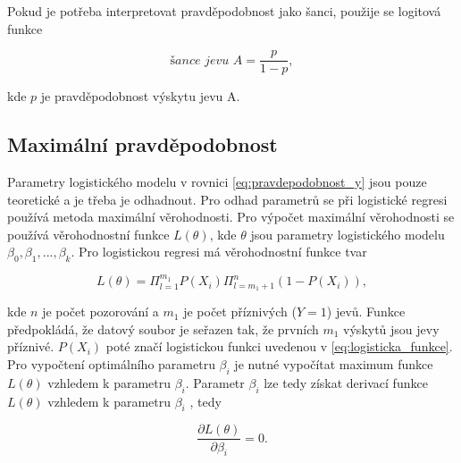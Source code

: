 Pokud je potřeba interpretovat pravděpodobnost jako šanci, použije se logitová funkce

\begin{equation}
    \label{eq:logitova_funkce}
    \textit{šance jevu A} = \frac{p}{1 - p},
\end{equation}

kde $p$ je pravděpodobnost výskytu jevu A.

\subsection{Maximální pravděpodobnost}
Parametry logistického modelu v rovnici \ref{eq:pravdepodobnost_y} jsou pouze teoretické a je třeba je odhadnout. Pro odhad parametrů se při logistické regresi používá metoda
maximální věrohodnosti. Pro výpočet maximální věrohodnosti se používá věrohodnostní funkce $L(\theta)$, kde $\theta$ jsou parametry logistického modelu
$\beta_0, \beta_1, ..., \beta_k$. Pro logistickou regresi má věrohodnostní funkce tvar

\begin{equation}
    \label{eq:pravdepodobnostni_fce}
    L(\theta) = \Pi_{l = 1}^{m_1} P(X_i) \Pi_{l = m_1 + 1}^{n} (1 - P(X_i)),
\end{equation}

kde $n$ je počet pozorování a $m_1$ je počet příznivých ($Y = 1$) jevů. Funkce předpokládá, že datový soubor je seřazen tak, že prvních $m_1$ výskytů
jsou jevy příznivé. $P(X_i)$ poté značí logistickou funkci uvedenou v \ref{eq:logisticka_funkce}. Pro vypočtení optimálního parametru $\beta_i$ je nutné vypočítat
maximum funkce $L(\theta)$ vzhledem k parametru $\beta_i$. Parametr $\beta_i$ lze tedy získat derivací funkce $L(\theta)$ vzhledem k parametru $\beta_i$
\cite{kleinbaum_logistic_2010}, tedy

\begin{equation}
    \frac{\partial L(\theta)}{\partial \beta_i} = 0.
\end{equation}

